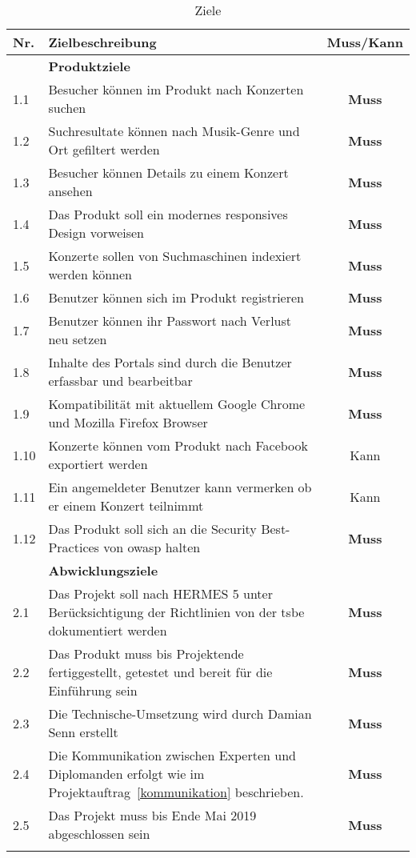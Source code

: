 \begin{longtable}[]{@{}lp{10.5cm}c@{}}
  \toprule
  Nr.  & Zielbeschreibung                                                                                                   & Muss/Kann\tabularnewline
  \toprule
       & \textbf{Produktziele}\tabularnewline
  \midrule
  1.1  & Besucher können im Produkt nach Konzerten suchen                                                                   & \textbf{Muss}\tabularnewline
  1.2  & Suchresultate können nach Musik-Genre und Ort gefiltert werden                                                     & \textbf{Muss}\tabularnewline
  1.3  & Besucher können Details zu einem Konzert ansehen                                                                   & \textbf{Muss}\tabularnewline
  1.4  & Das Produkt soll ein modernes responsives Design vorweisen                                                         & \textbf{Muss}\tabularnewline
  1.5  & Konzerte sollen von Suchmaschinen indexiert werden können                                                          & \textbf{Muss}\tabularnewline
  1.6  & Benutzer können sich im Produkt registrieren                                                                       & \textbf{Muss}\tabularnewline
  1.7  & Benutzer können ihr Passwort nach Verlust neu setzen                                                               & \textbf{Muss}\tabularnewline
  1.8  & Inhalte des Portals sind durch die Benutzer erfassbar und bearbeitbar                                              & \textbf{Muss}\tabularnewline
  1.9  & Kompatibilität mit aktuellem Google Chrome und Mozilla Firefox Browser                                             & \textbf{Muss}\tabularnewline
  1.10 & Konzerte können vom Produkt nach Facebook exportiert werden                                                        & Kann\tabularnewline
  1.11 & Ein angemeldeter Benutzer kann vermerken ob er einem Konzert teilnimmt                                             & Kann\tabularnewline
  1.12 & Das Produkt soll sich an die Security Best-Practices von \Gls{owasp} halten                                        & \textbf{Muss}\tabularnewline
  \toprule
       & \textbf{Abwicklungsziele}\tabularnewline
  \midrule
  2.1  & Das Projekt soll nach HERMES 5 unter Berücksichtigung der Richtlinien von der \Gls{tsbe} dokumentiert werden       & \textbf{Muss}\tabularnewline
  2.2  & Das Produkt muss bis Projektende fertiggestellt, getestet und bereit für die Einführung sein                       & \textbf{Muss}\tabularnewline
  2.3  & Die Technische-Umsetzung wird durch Damian Senn erstellt                                                           & \textbf{Muss}\tabularnewline
  2.4  & Die Kommunikation zwischen Experten und Diplomanden erfolgt wie im Projektauftrag~\ref{kommunikation} beschrieben. & \textbf{Muss}\tabularnewline
  2.5  & Das Projekt muss bis Ende Mai 2019 abgeschlossen sein                                                              & \textbf{Muss}\tabularnewline
  \bottomrule
  \caption{Ziele}
\end{longtable}
